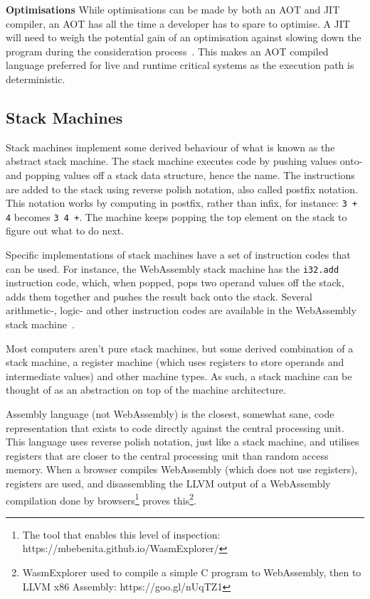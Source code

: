 \documentclass[a4paper]{article}
\begin{document}
\noindent \textbf{Optimisations} While optimisations can be made by both an AOT and JIT compiler, an AOT has all the time a developer has to spare to optimise. A JIT will need to weigh the potential gain of an optimisation against slowing down the program during the consideration process~\cite{website:mozhack:fast-wasm}. This makes an AOT compiled language preferred for live and runtime critical systems as the execution path is deterministic.

\subsection{Stack Machines}
\label{sec:problem-analysis:stack-machines}
Stack machines implement some derived behaviour of what is known as the abstract stack machine. The stack machine executes code by pushing values onto- and popping values off a stack data structure, hence the name. The instructions are added to the stack using reverse polish notation, also called postfix notation. This notation works by computing in postfix, rather than infix, for instance: \texttt{3 + 4} becomes \texttt{3 4 +}. The machine keeps popping the top element on the stack to figure out what to do next.

Specific implementations of stack machines have a set of instruction codes that can be used. For instance, the WebAssembly stack machine has the \texttt{i32.add} instruction code, which, when popped, pops two operand values off the stack, adds them together and pushes the result back onto the stack. Several arithmetic-, logic- and other instruction codes are available in the WebAssembly stack machine~\cite{website:wasm-binary-encoding}.

Most computers aren't pure stack machines, but some derived combination of a stack machine, a register machine (which uses registers to store operands and intermediate values) and other machine types. As such, a stack machine can be thought of as an abstraction on top of the machine architecture.

Assembly language (not WebAssembly) is the closest, somewhat sane, code representation that exists to code directly against the central processing unit. This language uses reverse polish notation, just like a stack machine, and utilises registers that are closer to the central processing unit than random access memory. When a browser compiles WebAssembly (which does not use registers), registers are used, and disassembling the LLVM output of a WebAssembly compilation done by browsers\footnote{The tool that enables this level of inspection: https://mbebenita.github.io/WasmExplorer/} proves this\footnote{WasmExplorer used to compile a simple C program to WebAssembly, then to LLVM x86 Assembly: https://goo.gl/nUqTZ1}.
\end{document}
